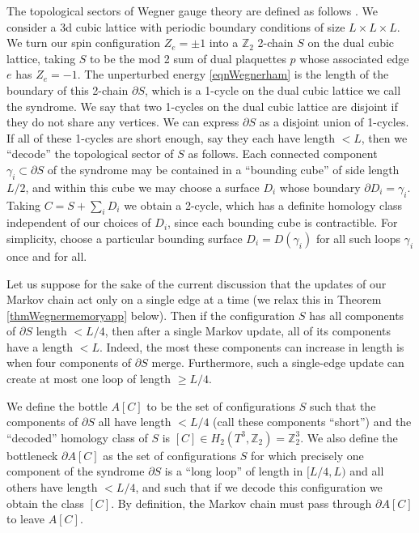 \documentclass[prx,letterpaper,aps,superscriptaddress,floatfix,twocolumn,nofootinbib]{revtex4-2}
\def\bZ{\mathbb{Z}}
\theoremstyle{definition}
\begin{document}
The topological sectors of Wegner gauge theory are defined as follows \cite{Castelnovo_2008,serna2024worldsheetpatching1formsymmetries,stahl2026slow}. We consider a 3d cubic lattice with periodic boundary conditions of size $L \times L \times L$. We turn our spin configuration $Z_e = \pm 1$ into a $\bZ_2$ 2-chain $S$ on the dual cubic lattice, taking $S$ to be the mod 2 sum of dual plaquettes $p$ whose associated edge $e$ has $Z_e = -1$. The unperturbed energy \eqref{eqnWegnerham} is the length of the boundary of this 2-chain $\partial S$, which is a 1-cycle on the dual cubic lattice we call the syndrome. We say that two 1-cycles on the dual cubic lattice are disjoint if they do not share any vertices. We can express $\partial S$ as a disjoint union of 1-cycles. If all of these 1-cycles are short enough, say they each have length $< L$, then we ``decode'' the topological sector of $S$ as follows. Each connected component $\gamma_i \subset \partial S$ of the syndrome may be contained in a ``bounding cube'' of side length $L/2$, and within this cube we may choose a surface $D_i$ whose boundary $\partial D_i =\gamma_i$. Taking $C=S + \sum_i D_i$ we obtain a 2-cycle, which has a definite homology class independent of our choices of $D_i$, since each bounding cube is contractible. For simplicity, choose a particular bounding surface $D_i = D(\gamma_i)$ for all such loops $\gamma_i$ once and for all.

Let us suppose for the sake of the current discussion that the updates of our Markov chain act only on a single edge at a time (we relax this in Theorem \ref{thmWegnermemoryapp} below). Then if the configuration $S$ has all components of $\partial S$ length $< L/4$, then after a single Markov update, all of its components have a length $<L$. Indeed, the most these components can increase in length is when four components of $\partial S$ merge. Furthermore, such a single-edge update can create at most one loop of length $\ge L/4$.

We define the bottle $A[C]$ to be the set of configurations $S$ such that the components of $\partial S$ all have length $<L/4$ (call these components ``short'') and the ``decoded'' homology class of $S$ is $[C] \in H_2(T^3,\bZ_2) = \bZ_2^3$. We also define the bottleneck $\partial A[C]$ as the set of configurations $S$ for which precisely one component of the syndrome $\partial S$ is a ``long loop'' of length in $[L/4,L)$ and all others have length $< L/4$, and such that if we decode this configuration we obtain the class $[C]$. By definition, the Markov chain must pass through $\partial A[C]$ to leave $A[C]$.
\end{document}
